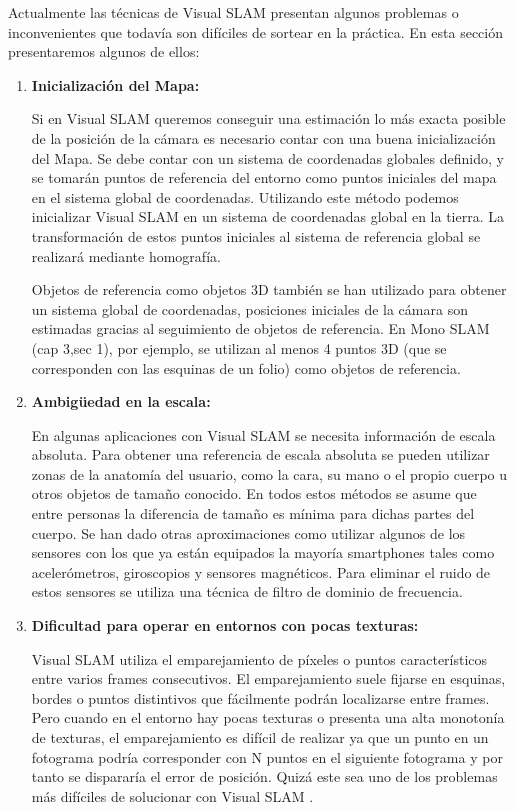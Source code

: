 Actualmente las técnicas de Visual SLAM presentan algunos problemas o inconvenientes que todavía son difíciles de sortear en la práctica. En esta sección presentaremos algunos de ellos:
\begin {enumerate}
\item \textbf{Inicialización del Mapa:}

Si en Visual SLAM queremos conseguir una estimación lo más exacta posible de la posición de la cámara es necesario contar con una buena inicialización del Mapa. Se debe contar con un sistema de coordenadas globales definido, y se tomarán puntos de referencia del entorno como puntos iniciales del mapa en el sistema global de coordenadas. Utilizando este método podemos inicializar Visual SLAM en un sistema de coordenadas global en la tierra. La transformación de estos puntos iniciales al sistema de referencia global se realizará mediante homografía.

Objetos de referencia como objetos 3D también se han utilizado para obtener un sistema global de coordenadas, posiciones iniciales de la cámara son estimadas gracias al seguimiento de objetos de referencia.
En Mono SLAM (cap 3,sec 1), por ejemplo, se utilizan al menos 4 puntos 3D (que se corresponden con las esquinas de un folio) como objetos de referencia.

\item \textbf{Ambigüedad en la escala:}

En algunas aplicaciones con Visual SLAM se necesita información de escala absoluta. Para obtener una referencia de escala absoluta se pueden utilizar zonas de la anatomía del usuario, como la cara, su mano o el propio cuerpo u otros objetos de tamaño conocido. En todos estos métodos se asume que entre personas la diferencia de tamaño es mínima para dichas partes del cuerpo. Se han dado otras aproximaciones como utilizar algunos de los sensores con los que ya están equipados la mayoría smartphones tales como acelerómetros, giroscopios y sensores magnéticos. Para eliminar el ruido de estos sensores se utiliza una técnica de filtro de dominio de frecuencia.


\item \textbf{Dificultad para operar en entornos con pocas texturas:}

Visual SLAM utiliza el emparejamiento de píxeles o puntos característicos entre varios frames consecutivos. El emparejamiento suele fijarse en esquinas, bordes  o puntos distintivos que fácilmente podrán localizarse entre frames. Pero cuando en el entorno hay pocas texturas o presenta una alta monotonía de texturas,  el emparejamiento es difícil de realizar ya que un punto en un fotograma podría corresponder con N puntos en el siguiente fotograma y por tanto se dispararía el error de posición. Quizá este sea uno de los problemas más difíciles de solucionar con Visual SLAM
\cite{Takafumi17}.


\end{enumerate}
